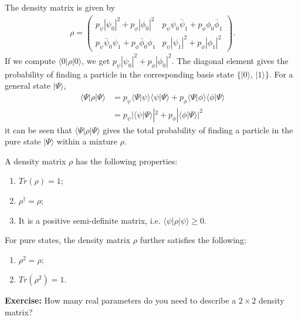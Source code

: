 \documentclass{beamer}
\begin{document}
\begin{frame}
\justify
The density matrix is given by
\begin{align}
\rho = \begin{pmatrix} p_\psi |\psi_0|^2 + p_\phi |\phi_0|^2 & p_\psi \psi_0 \bar{\psi}_1 + p_\phi \phi_0 \bar{\phi}_1 \\ p_\psi \bar{\psi}_0 \psi_1 + p_\phi \bar{\phi}_0 \phi_1 & p_\psi |\psi_1|^2 + p_\phi |\phi_1|^2 \end{pmatrix}.
\end{align}
If we compute $\langle 0 | \rho | 0 \rangle$, we get $p_\psi |\psi_0|^2 + p_\phi |\phi_0|^2$.
\vfill
The diagonal element gives the probability of finding a particle in the corresponding basis state $\{|0\rangle,\, |1\rangle\}$.
\vfill
For a general state $|\Psi\rangle$,
\begin{align}
\langle\Psi| \rho |\Psi\rangle & = p_\psi \langle\Psi|\psi\rangle \langle\psi|\Psi\rangle + p_\phi \langle\Psi|\phi\rangle \langle\phi|\Psi\rangle \nonumber \\
& = p_\psi |\langle\psi|\Psi\rangle|^2 + p_\phi |\langle\phi|\Psi\rangle|^2
\end{align}
it can be seen that $\langle\Psi| \rho |\Psi\rangle$ gives the total probability of finding a particle in the pure state $|\Psi\rangle$ within a mixture $\rho$.
\end{frame}

\begin{frame}
\justify
A density matrix $\rho$ has the following properties:
\begin{enumerate}
\item $Tr(\rho) = 1$;
\item $\rho^\dagger = \rho$;
\item It is a positive semi-definite matrix, i.e. $\langle\psi|\rho|\psi\rangle \geq 0$.
\end{enumerate}
\vfill
For pure states, the density matrix $\rho$ further satisfies the following:
\begin{enumerate}
\item $\rho^2 = \rho$;
\item $Tr(\rho^2) = 1$.
\end{enumerate}
\vfill
\textbf{Exercise:} How many real parameters do you need to describe a $2\times 2$ density matrix?
\end{frame}
\end{document}
